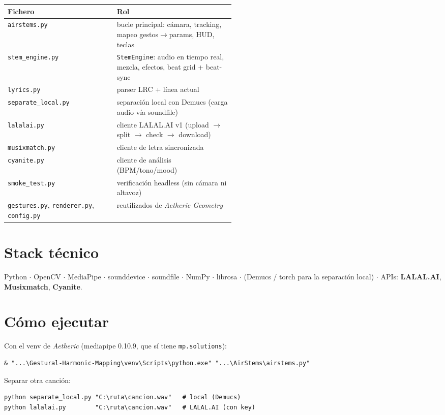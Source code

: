 \documentclass[11pt]{article}
\newcommand{\code}[1]{\texttt{#1}}
\begin{document}
\begin{center}
\begin{tabular}{@{}l p{0.52\linewidth}@{}}
\toprule
\textbf{Fichero} & \textbf{Rol} \\
\midrule
\code{airstems.py} & bucle principal: cámara, tracking, mapeo gestos$\to$params, HUD, teclas \\
\code{stem\_engine.py} & \code{StemEngine}: audio en tiempo real, mezcla, efectos, beat grid + beat-sync \\
\code{lyrics.py} & parser LRC + línea actual \\
\code{separate\_local.py} & separación local con Demucs (carga audio vía soundfile) \\
\code{lalalai.py} & cliente LALAL.AI v1 (upload $\to$ split $\to$ check $\to$ download) \\
\code{musixmatch.py} & cliente de letra sincronizada \\
\code{cyanite.py} & cliente de análisis (BPM/tono/mood) \\
\code{smoke\_test.py} & verificación headless (sin cámara ni altavoz) \\
\code{gestures.py}, \code{renderer.py}, \code{config.py} & reutilizados de \emph{Aetheric Geometry} \\
\bottomrule
\end{tabular}
\end{center}

\section{Stack técnico}

Python $\cdot$ OpenCV $\cdot$ MediaPipe $\cdot$ sounddevice $\cdot$ soundfile $\cdot$ NumPy $\cdot$
librosa $\cdot$ (Demucs / torch para la separación local) $\cdot$ APIs: \textbf{LALAL.AI},
\textbf{Musixmatch}, \textbf{Cyanite}.

\section{Cómo ejecutar}

Con el venv de \emph{Aetheric} (mediapipe 0.10.9, que sí tiene \code{mp.solutions}):
{\footnotesize\begin{verbatim}
& "...\Gestural-Harmonic-Mapping\venv\Scripts\python.exe" "...\AirStems\airstems.py"
\end{verbatim}}
Separar otra canción:
{\footnotesize\begin{verbatim}
python separate_local.py "C:\ruta\cancion.wav"   # local (Demucs)
python lalalai.py        "C:\ruta\cancion.wav"   # LALAL.AI (con key)
\end{verbatim}}
\end{document}
